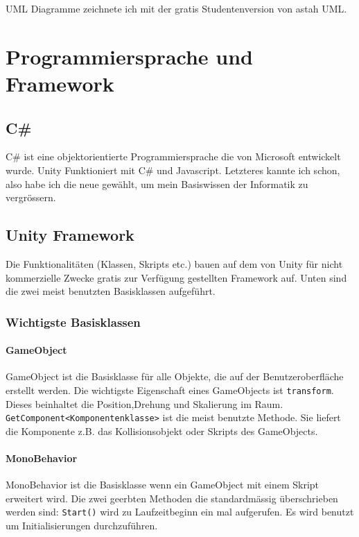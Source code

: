 UML Diagramme zeichnete ich mit der gratis Studentenversion von astah UML.

\section{Programmiersprache und Framework}

\subsection{C\#}
C\# ist eine objektorientierte Programmiersprache die von Microsoft entwickelt wurde.
Unity Funktioniert mit C\# und Javascript.
Letzteres kannte ich schon, also habe ich die neue gewählt, um mein Basiswissen der Informatik zu vergrössern.


\subsection{Unity Framework}
Die Funktionalitäten (Klassen, Skripts etc.) bauen auf dem von Unity für nicht kommerzielle Zwecke gratis zur Verfügung gestellten Framework auf.
Unten sind die zwei meist benutzten Basisklassen aufgeführt.

\subsubsection{Wichtigste Basisklassen}

\paragraph{GameObject}
GameObject ist die Basisklasse für alle Objekte, die auf der Benutzeroberfläche erstellt werden.
Die wichtigste Eigenschaft eines GameObjects ist \lstinline{transform}.
Dieses beinhaltet die Position,Drehung und Skalierung im Raum.
\lstinline{GetComponent<Komponentenklasse>} ist die meist benutzte Methode. 
Sie liefert die Komponente z.B. das Kollisionsobjekt oder Skripts des GameObjects. 

\paragraph{MonoBehavior}

MonoBehavior ist die Basisklasse wenn ein GameObject mit einem Skript erweitert wird.
Die zwei geerbten Methoden die standardmässig überschrieben werden sind:
\lstinline{Start()} wird zu Laufzeitbeginn ein mal aufgerufen.
Es wird benutzt um Initialisierungen durchzuführen.

